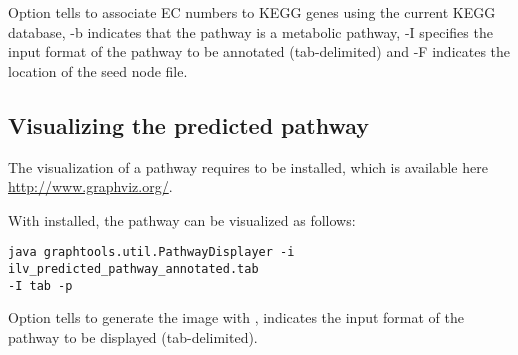 Option  tells  to associate EC numbers to
KEGG genes using the current KEGG database, {-b} indicates that the pathway is a metabolic
pathway, {-I} specifies the input format of the pathway to be annotated
(tab-delimited) and {-F} indicates the location of the seed node file.

\subsection{Visualizing the predicted pathway}\label{Visualize}

The visualization of a pathway requires  to be installed,
which is available here \url{http://www.graphviz.org/}.

With  installed, the pathway can be visualized as follows:

\begin{lstlisting}
java graphtools.util.PathwayDisplayer -i ilv_predicted_pathway_annotated.tab 
-I tab -p
\end{lstlisting}

Option  tells  to generate the image with
,  indicates the input format of the pathway to be
displayed (tab-delimited).

